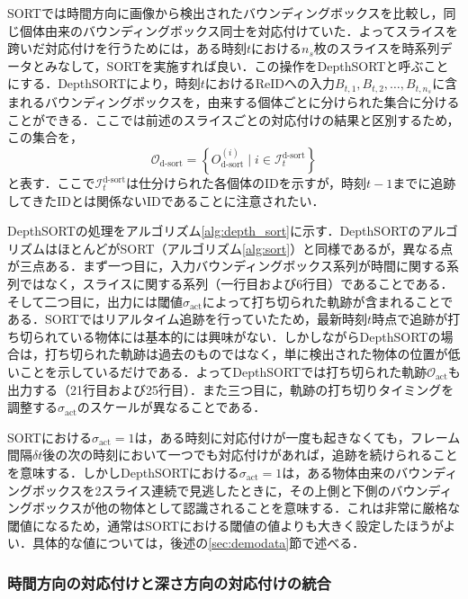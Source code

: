         SORTでは時間方向に画像から検出されたバウンディングボックスを比較し，同じ個体由来のバウンディングボックス同士を対応付けていた．よってスライスを跨いだ対応付けを行うためには，ある時刻$t$における$n_s$枚のスライスを時系列データとみなして，SORTを実施すれば良い．この操作をDepthSORTと呼ぶことにする．DepthSORTにより，時刻$t$におけるReIDへの入力$B_{t, 1}, B_{t,2}, \dots, B_{t, n_s}$に含まれるバウンディングボックスを，由来する個体ごとに分けられた集合に分けることができる．ここでは前述のスライスごとの対応付けの結果と区別するため，この集合を，
        \begin{equation}
            \label{eq:dsort_identified_bboxes}
            \mathcal{O}_{\text{d-sort}} = \left\{O_{\text{d-sort}}^{(i)} \mid i \in \mathcal{I}_{t}^{\text{d-sort}}\right\}
        \end{equation}
        と表す．ここで$\mathcal{I}_t^{\text{d-sort}}$は仕分けられた各個体のIDを示すが，時刻$t-1$までに追跡してきたIDとは関係ないIDであることに注意されたい．

        DepthSORTの処理をアルゴリズム\ref{alg:depth_sort}に示す．DepthSORTのアルゴリズムはほとんどがSORT（アルゴリズム\ref{alg:sort}）と同様であるが，異なる点が三点ある．まず一つ目に，入力バウンディングボックス系列が時間に関する系列ではなく，スライスに関する系列（一行目および6行目）であることである．そして二つ目に，出力には閾値$\sigma_{\text{act}}$によって打ち切られた軌跡が含まれることである．SORTではリアルタイム追跡を行っていたため，最新時刻$t$時点で追跡が打ち切られている物体には基本的には興味がない．しかしながらDepthSORTの場合は，打ち切られた軌跡は過去のものではなく，単に検出された物体の位置が低いことを示しているだけである．よってDepthSORTでは打ち切られた軌跡$\mathcal{O}_{\text{act}}$も出力する（21行目および25行目）．また三つ目に，軌跡の打ち切りタイミングを調整する$\sigma_{\text{act}}$のスケールが異なることである．

        SORTにおける$\sigma_{\text{act}} = 1$は，ある時刻に対応付けが一度も起きなくても，フレーム間隔$\delta t$後の次の時刻において一つでも対応付けがあれば，追跡を続けられることを意味する．しかしDepthSORTにおける$\sigma_{\text{act}} = 1$は，ある物体由来のバウンディングボックスを2スライス連続で見逃したときに，その上側と下側のバウンディングボックスが他の物体として認識されることを意味する．これは非常に厳格な閾値になるため，通常はSORTにおける閾値の値よりも大きく設定したほうがよい．具体的な値については，後述の\ref{sec:demodata}節で述べる．
        
        \subsubsection{時間方向の対応付けと深さ方向の対応付けの統合}
        \label{subsubsec:integration_of_matchings}

